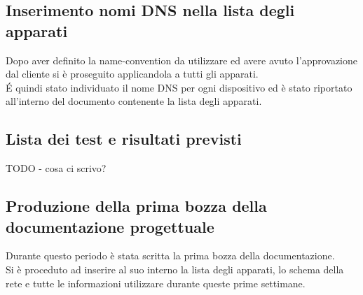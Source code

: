 \documentclass[Realizzazione.tex]{subfiles}
\begin{document}
\subsection{Inserimento nomi DNS nella lista degli apparati}
Dopo aver definito la name-convention da utilizzare ed avere avuto l'approvazione dal cliente si è proseguito applicandola a tutti gli apparati. \\
\'E quindi stato individuato il nome DNS per ogni dispositivo ed è stato riportato all'interno del documento contenente la lista degli apparati.

\subsection{Lista dei test e risultati previsti}
TODO - cosa ci scrivo?
\subsection{Produzione della prima bozza della documentazione progettuale}
Durante questo periodo è stata scritta la prima bozza della documentazione. \\
Si è proceduto ad inserire al suo interno la lista degli apparati, lo schema della rete e tutte le informazioni utilizzare durante queste prime settimane.
\end{document}
